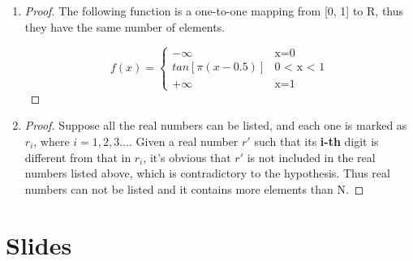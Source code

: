 \documentclass[paper=a4, fontsize=11pt]{scrartcl} %
\numberwithin{equation}{section} %
\numberwithin{figure}{section} %
\numberwithin{table}{section} %
\begin{document}
\begin{enumerate}
\begin{proof}
		\end{proof}	
	\item 
		\begin{proof}
			The following function is a one-to-one mapping from [0, 1] to R, thus they have the same number of elements.	
			
			\begin{equation}
				f(x) = 
				\begin{cases}
				-\infty& \text{x=0}\\
				tan[\pi(x-0.5)] & \text{0 < x < 1}\\
				+\infty& \text{x=1}
				\end{cases}
			\end{equation}
			
		\end{proof}
	\item
		\begin{proof}
			Suppose all the real numbers can be listed, and each one is marked as $r_i$, where $i=1,2,3...$. Given a real number $r\prime$ such that its \textbf{i-th} digit is different from that in $r_i$, it's obvious that $r\prime$ is not included in the real numbers listed above, which is contradictory to the hypothesis. Thus real numbers can not be listed and it contains more elements than N.
		\end{proof}
\end{enumerate}


\section{Slides}
\end{document}

